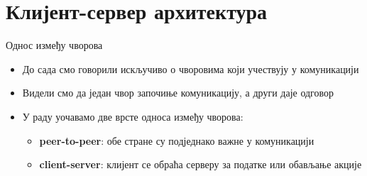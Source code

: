 \documentclass[aspectratio=169]{beamer}
\begin{document}
    \section{Клијент-сервер архитектура}
    
    \begin{frame}{Однос између чворова}
        \begin{itemize}
            \item До сада смо говорили искључиво о чворовима који учествују у комуникацији
            \item Видели смо да један чвор започиње комуникацију, а други даје одговор
            \item У раду уочавамо две врсте односа између чворова:
            \begin{itemize}
                \item \textbf{peer-to-peer}: обе стране су подједнако важне у комуникацији
                \item \textbf{client-server}: клијент се обраћа серверу за податке или обављање акције
            \end{itemize}
        \end{itemize}
    \end{frame}
    
\end{document}
